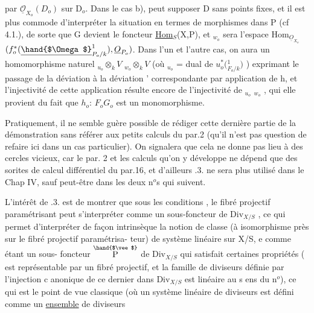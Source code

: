 
par $\underline{\mathcal{O}}_{X_o}(D_o)$ sur D$_o$. Dans le cas b),  peut supposer D sans points
fixes, et il est plus commode d'interpréter la situation en termes de
morphismes dans P (cf 4.1.), de sorte que G devient le foncteur
\underline{Hom}$_S$(X,P), et $_{w_o}$ sera l'espace  Hom$_{\underline{O}_{X_o}}$$(f_o^{*}(\underline{\hand{$\Omega$}}^{1}_{P_o/k}), \underline{O}_{P_o})$.
Dans l'un et l'autre cas, on aura un homomorphisme naturel
$_{u_o}\otimes_k V$ \hand{$\to$} $_{w_o}\otimes_k V$ (où $_{u_o}$ = dual de $u_o^{*}($\hand{$\Omega$}$^{1}_{F_o/k})$ ) exprimant le passage
de la déviation \hand{$\delta$} à la déviation \hand{$\delta$}' correspondante par application de h,
et l'injectivité de cette application résulte encore de l'injectivité
de $_{u_o}$\hand{$\to$} $_{w_o}$ , qui elle provient du fait que $h_o$: $F_o$\hand{$\to$}$G_o$ est un
monomorphisme.
\margin{$/$}

Pratiquement, il ne semble guère possible de rédiger cette dernière
partie de la démonstration sans référer aux petits calculs du par.2
(qu'il n'est pas question de refaire ici dans un cas particulier). On
signalera que cela ne donne pas lieu à des cercles vicieux, car le par.
2  et les calculs qu'on y  développe ne dépend que des sorites
de calcul différentiel du par.16, et d'ailleurs .3. ne sera plus
utilisé dans le Chap IV, sauf peut-être dans les deux n$^{o}$s qui suivent.

L'intérêt de .3. est de montrer que sous les conditions ,
le fibré projectif paramétrisant peut s'interpréter comme un sous-foncteur
de Div$_{X/S}$ , ce qui permet d'interpréter de façon intrinsèque la notion
de classe (à isomorphisme près sur le  fibré projectif paramétrisa-%
teur) de système linéaire sur X/S, e comme étant un sous-
foncteur $\overset{\hand{$\vee$}}{\text{P}}$ de Div$_{X/S}$ qui satisfait certaines propriétés ( est
représentable par un fibré projectif, et la famille de diviseurs définie
par l'injection c anonique de ce dernier dans Div$_{X/S}$ est linéaire au s ens
du n$^{o}$), ce qui est  le point de vue classique (où un
système linéaire de diviseurs est défini comme un \uline{ensemble} de diviseurs

